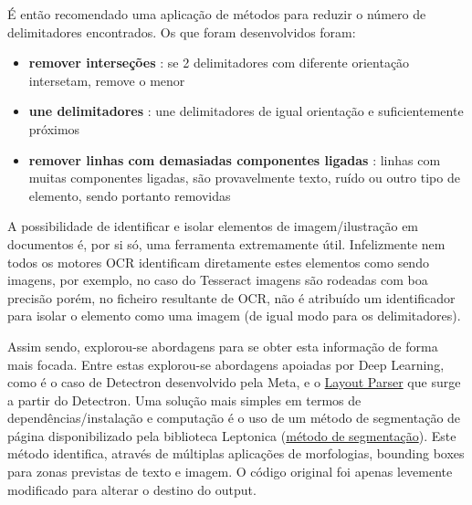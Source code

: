 
É então recomendado uma aplicação de métodos para reduzir o número de delimitadores encontrados.
Os que foram desenvolvidos foram:

\begin{itemize}\setlength\itemsep{-0.3em}
	\item \textbf{remover interseções} : se 2 delimitadores com diferente orientação intersetam, remove o menor
	\item \textbf{une delimitadores} : une delimitadores de igual orientação e suficientemente próximos
	\item \textbf{remover linhas com demasiadas componentes ligadas} : linhas com muitas componentes ligadas, são provavelmente texto, ruído ou outro tipo de elemento, sendo portanto removidas
\end{itemize}




\label{contribution_image_document_image_identification}


A possibilidade de identificar e isolar elementos de imagem/ilustração em documentos é, por si só, uma ferramenta extremamente útil. Infelizmente nem todos os motores OCR identificam diretamente estes elementos como sendo imagens, por exemplo, no caso do Tesseract imagens são rodeadas com boa precisão porém, no ficheiro resultante de OCR, não é atribuído um identificador para isolar o elemento como uma imagem (de igual modo para os delimitadores). 

Assim sendo, explorou-se abordagens para se obter esta informação de forma mais focada.
Entre estas explorou-se abordagens apoiadas por Deep Learning, como é o caso de Detectron desenvolvido pela Meta, e o \href{https://layout-parser.readthedocs.io/en/latest/index.html}{Layout Parser} que surge a partir do Detectron. 
Uma solução mais simples em termos de dependências/instalação e computação é o uso de um método de segmentação de página disponibilizado pela biblioteca Leptonica (\href{https://tpgit.github.io/Leptonica/livre__pageseg_8c_source.html}{método de segmentação}). 
Este método identifica, através de múltiplas aplicações de morfologias, bounding boxes para zonas previstas de texto e imagem.
O código original foi apenas levemente modificado para alterar o destino do output.


